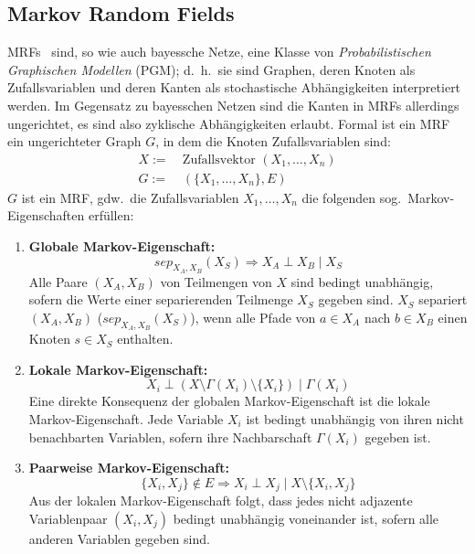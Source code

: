 \subsection{Markov Random Fields}%
\label{sec:theory:psl:mrf}

MRFs~\cite[Kapitel 19]{Murphy2012} sind, so wie auch bayessche Netze, eine Klasse von \textit{Probabilistischen Graphischen Modellen} (PGM);
d.~h.\ sie sind Graphen, deren Knoten als Zufallsvariablen und deren Kanten als stochastische Abhängigkeiten interpretiert werden.
Im Gegensatz zu bayesschen Netzen sind die Kanten in MRFs allerdings ungerichtet, es sind also zyklische Abhängigkeiten erlaubt.
Formal ist ein MRF ein ungerichteter Graph $G$, in dem die Knoten Zufallsvariablen sind:
\begin{align*}
	X :=&\ \text{Zufallsvektor } (X_1, \dots, X_n) \\
	G :=&\ (\{ X_1, \dots, X_n \}, E)
\end{align*}
$G$ ist ein MRF, gdw.\ die Zufallsvariablen $X_1, \dots, X_n$ die folgenden sog.~Markov-Eigenschaften erfüllen:
\begin{enumerate}
	\item \textbf{Globale Markov-Eigenschaft:}
		\[sep_{X_A, X_B}(X_S) \Rightarrow X_A \perp X_B \mid X_S\]
		Alle Paare $(X_A, X_B)$ von Teilmengen von $X$ sind bedingt unabhängig, sofern die Werte einer separierenden Teilmenge $X_S $ gegeben sind.
		$X_S$ separiert $(X_A, X_B)$ ($sep_{X_A, X_B}(X_S)$), wenn alle Pfade von $a \in X_A$ nach $b \in X_B$ einen Knoten $s \in X_S$ enthalten.
	\item \textbf{Lokale Markov-Eigenschaft:}
		\[X_i \perp (X \setminus \Gamma(X_i) \setminus \{X_i\}) \mid \Gamma(X_i)\]
		Eine direkte Konsequenz der globalen Markov-Eigenschaft ist die lokale Markov-Eigenschaft.
		Jede Variable $X_i$ ist bedingt unabhängig von ihren nicht benachbarten Variablen, sofern ihre Nachbarschaft $\Gamma(X_i)$ gegeben ist.
	\item \textbf{Paarweise Markov-Eigenschaft:}
		\[\{ X_i, X_j \} \notin E \Rightarrow X_i \perp X_j \mid X \setminus \{ X_i, X_j \}\] %
		Aus der lokalen Markov-Eigenschaft folgt, dass jedes nicht adjazente Variablenpaar $(X_i, X_j)$ bedingt unabhängig voneinander ist, sofern alle anderen Variablen gegeben sind.
\end{enumerate}

